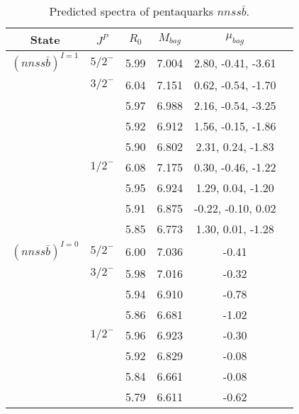 \documentclass[prd,twocolumn,floatfix,nofootinbib]{revtex4}
\begin{document}
\renewcommand{\tabcolsep}{0.5cm}
\renewcommand{\arraystretch}{1.2}
\begin{table*}[!htbp]
    \caption{Predicted spectra of pentaquarks $nnss\bar{b}$.}
    \begin{tabular}{cccccc}
        \hline\hline
        {\rm State} &$J^{P}$ &$R_{0}$ &$M_{bag}$ &$\mu_{bag}$  \\ \hline
        ${(nnss\bar{b})}^{I=1}$
            &${5/2}^{-}$    &5.99   &7.004  &2.80, -0.41, -3.61   \\
            &${3/2}^{-}$    &6.04   &7.151  &0.62, -0.54, -1.70  \\
            &               &5.97   &6.988  &2.16, -0.54, -3.25  \\
            &               &5.92   &6.912  &1.56, -0.15, -1.86  \\
            &               &5.90   &6.802  &2.31, 0.24, -1.83  \\
            &${1/2}^{-}$    &6.08   &7.175  &0.30, -0.46, -1.22  \\
            &               &5.95   &6.924  &1.29, 0.04, -1.20  \\
            &               &5.91   &6.875  &-0.22, -0.10, 0.02  \\
            &               &5.85   &6.773  &1.30, 0.01, -1.28  \\
        ${(nnss\bar{b})}^{I=0}$
            &${5/2}^{-}$    &6.00   &7.036  &-0.41  \\
            &${3/2}^{-}$    &5.98   &7.016  &-0.32  \\
            &               &5.94   &6.910  &-0.78  \\
            &               &5.86   &6.681  &-1.02  \\
            &${1/2}^{-}$    &5.96   &6.923  &-0.30  \\
            &               &5.92   &6.829  &-0.08  \\
            &               &5.84   &6.661  &-0.08  \\
            &               &5.79   &6.611  &-0.62  \\
        \hline\hline
    \end{tabular}
\end{table*}
\end{document}

